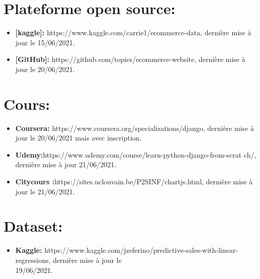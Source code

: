 \documentclass[a4paper]{report}
\begin{document}
\section{Plateforme open source:}
\begin{itemize}
    \item \textbf{[kaggle]:}
          https://www.kaggle.com/carrie1/ecommerce-data, dernière mise à jour le
          15/06/2021.
    \item \textbf{[GitHub]:}
          https://github.com/topics/ecommerce-website, dernière mise à jour le
          20/06/2021.
\end{itemize}
\section{Cours:}
\begin{itemize}
    \item \textbf{Coursera:}
          https://www.coursera.org/specializations/django, dernière mise à jour le
          20/06/2021 mais avec inscription.

    \item\textbf{Udemy:}https://www.udemy.com/course/learn-python-django-from-scrat
          ch/, dernière mise à jour 21/06/2021.
    \item \textbf{Citycours
              :}https://sites.uclouvain.be/P2SINF/chartjs.html, dernière mise à jour le
          21/06/2021.
\end{itemize}
\section{Dataset:}
\begin{itemize}
    \item \textbf{Kaggle:}
          https://www.kaggle.com/jzeferino/predictive-sales-with-linear-regressions,
          dernière mise à jour le\\ 19/06/2021.
\end{itemize}
\end{document}
